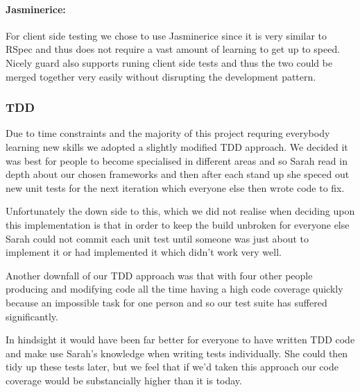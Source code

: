     \paragraph{Jasminerice:}
      For client side testing we chose to use Jasminerice since it is very similar to RSpec and thus does not require a vast amount of learning to get up to speed. Nicely guard also supports runing client side tests and thus the two could be merged together very easily without disrupting the development pattern.

  \subsubsection{TDD}
    Due to time constraints and the majority of this project requring everybody learning new skills we adopted a slightly modified TDD approach. We decided it was best for people to become specialised in different areas and so Sarah read in depth about our chosen frameworks and then after each stand up she speced out new unit tests for the next iteration which everyone else then wrote code to fix.

    Unfortunately the down side to this, which we did not realise when deciding upon this implementation is that in order to keep the build unbroken for everyone else Sarah could not commit each unit test until someone was just about to implement it or had implemented it which didn't work very well.

    Another downfall of our TDD approach was that with four other people producing and modifying code all the time having a high code coverage quickly because an impossible task for one person and so our test suite has suffered significantly.

    In hindsight it would have been far better for everyone to have written TDD code and make use Sarah's knowledge when writing tests individually. She could then tidy up these tests later, but we feel that if we'd taken this approach our code coverage would be substancially higher than it is today.